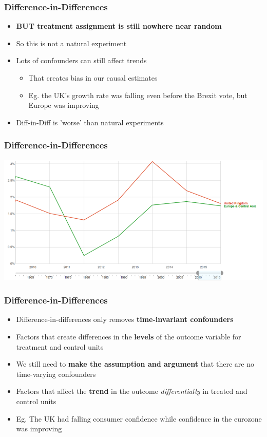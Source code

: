 \documentclass[xcolor=x11names,compress]{beamer}\usepackage[]{graphicx}\usepackage[]{color}
\renewcommand{\(}{\begin{columns}}
\renewcommand{\)}{\end{columns}}
\newcommand{\<}[1]{\begin{column}{#1}}
\renewcommand{\>}{\end{column}}
\begin{document}
\begin{frame}
\frametitle{Difference-in-Differences}
\begin{itemize}
\item \textbf{BUT treatment assignment is still nowhere near random}
\pause
\item So this is not a natural experiment
\pause
\item Lots of confounders can still affect trends
\pause
\begin{itemize}
\item That creates bias in our causal estimates
\item Eg. the UK's growth rate was falling even before the Brexit vote, but Europe was improving
\pause
\end{itemize}
\item Diff-in-Diff is 'worse' than natural experiments
\end{itemize}
\end{frame}

\begin{frame}
\frametitle{Difference-in-Differences}
\begin{center}
\includegraphics[scale=0.3]{figure/UK_growth.png}
\end{center}
\end{frame}

\begin{frame}
\frametitle{Difference-in-Differences}
\begin{itemize}
\item Difference-in-differences only removes \textbf{time-invariant confounders}
\pause
\item Factors that create differences in the \textbf{levels} of the outcome variable for treatment and control units
\pause
\item We still need to \textbf{make the assumption and argument} that there are no time-varying confounders
\pause
\item Factors that affect the \textbf{trend} in the outcome \textit{differentially} in treated and control units
\pause
\item Eg. The UK had falling consumer confidence while confidence in the eurozone was improving
\end{itemize}
\end{frame}
\end{document}
